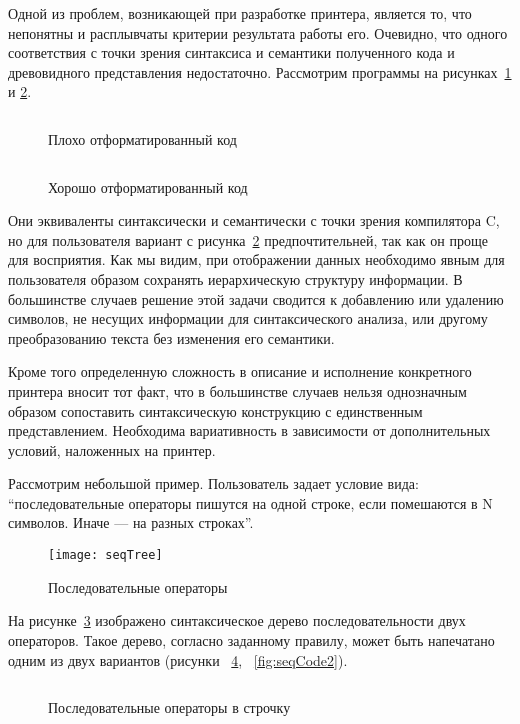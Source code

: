 Одной из проблем, возникающей при разработке принтера, является то, что непонятны и расплывчаты критерии результата работы его.
Очевидно, что одного соответствия с точки зрения синтаксиса и семантики полученного кода и древовидного представления недостаточно. Рассмотрим программы на рисунках~\ref{fig:wikiExUnfor} и \ref{fig:wikiExBSD}.

\begin{figure}[h!]
	\centering
	\inputminted{c}{codes/wikiExUnfor.c}
	\caption{Плохо отформатированный код}
	\label{fig:wikiExUnfor}
\end{figure}

\begin{figure}[h!]
	\centering
	\inputminted{c}{codes/wikiExBSD.c}
	\caption{Хорошо отформатированный код}
	\label{fig:wikiExBSD}
\end{figure}

Они эквиваленты синтаксически и семантически с точки зрения компилятора C, но для пользователя вариант с рисунка~\ref{fig:wikiExBSD} предпочтительней, так как он проще для восприятия. Как мы видим, при отображении данных необходимо явным для пользователя образом сохранять иерархическую структуру информации. В большинстве случаев решение этой задачи сводится к добавлению или удалению символов, не несущих информации для синтаксического анализа, или другому преобразованию текста без изменения его семантики.

Кроме того определенную сложность в описание и исполнение конкретного принтера вносит тот факт, что в большинстве случаев нельзя однозначным образом сопоставить синтаксическую конструкцию с единственным представлением. Необходима вариативность в зависимости от дополнительных условий, наложенных на принтер.

Рассмотрим небольшой пример. Пользователь задает условие вида: “последовательные операторы пишутся на одной строке, если помешаются в N символов. Иначе --- на разных строках”.

\begin{figure}[h]
	\centering
	\texttt{[image: seqTree]}
	\caption{Последовательные операторы}
	\label{fig:seqImage}
\end{figure}

На рисунке~\ref{fig:seqImage} изображено синтаксическое дерево последовательности двух операторов. Такое дерево, согласно заданному правилу, может быть напечатано одним из двух вариантов (рисунки ~\ref{fig:seqCode1}, ~\ref{fig:seqCode2}).

\begin{figure}[h]
	\inputminted{c}{codes/seqCode1.java}
	\caption{Последовательные операторы в строчку}
	\label{fig:seqCode1}
\end{figure}

